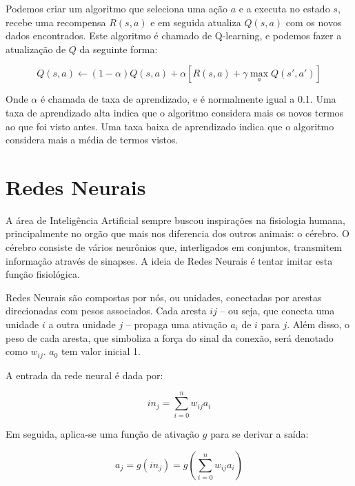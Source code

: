 \documentclass[a4paper,10pt]{article}
\theoremstyle{plain}
\begin{document}
Podemos criar um algoritmo que seleciona uma ação $a$ e a executa no estado $s$, recebe uma
recompensa $R(s,a)$ e em seguida atualiza $Q(s,a)$ com os novos dados encontrados. Este algoritmo
é chamado de Q-learning, e podemos fazer a atualização de $Q$ da seguinte forma:

\begin{equation*}
  Q(s, a) \gets (1-\alpha)Q(s,a) + \alpha[R(s,a) + \gamma \max_a Q(s', a')]
\end{equation*}

Onde $\alpha$ é chamada de taxa de aprendizado, e é normalmente igual a 0.1. Uma taxa de
aprendizado alta indica que o algoritmo considera mais os novos termos ao que foi visto antes. Uma
taxa baixa de aprendizado indica que o algoritmo considera mais a média de termos vistos.

\section{Redes Neurais}

A área de Inteligência Artificial sempre buscou inspirações na fisiologia humana, principalmente no
orgão que mais nos diferencia dos outros animais: o cérebro. O cérebro consiste de vários neurônios
que, interligados em conjuntos, transmitem informação através de sinapses. A ideia de Redes Neurais
é tentar imitar esta função fisiológica.

Redes Neurais são compostas por nós, ou unidades, conectadas por arestas direcionadas com pesos
associados. Cada aresta $ij$ -- ou seja, que conecta uma unidade $i$ a outra unidade $j$ -- propaga
uma ativação $a_i$ de $i$ para $j$. Além disso, o peso de cada aresta, que simboliza a força do
sinal da conexão, será denotado como $w_{ij}$. $a_0$ tem valor inicial 1.

A entrada da rede neural é dada por:

\begin{equation*}
  in_j = \sum_{i=0}^n w_{ij} a_i
\end{equation*}

Em seguida, aplica-se uma função de ativação $g$ para se derivar a saída:

\begin{equation*}
  a_j = g(in_j) = g \left(\sum_{i=0}^n w_{ij} a_i\right)
\end{equation*}
\end{document}
